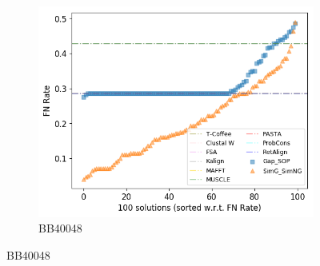 \begin{figure}[!htbp]
\begin{adjustwidth}{-1cm}{-1cm}
\begin{subfigure}{0.22\textwidth}
			\includegraphics[width=\columnwidth]{Figure/summary/precomputedInit/Balibase/BB40048_fnrate_density_single_run}
			\caption{BB40048}
		\end{subfigure}
	

\end{adjustwidth}
\end{figure}
